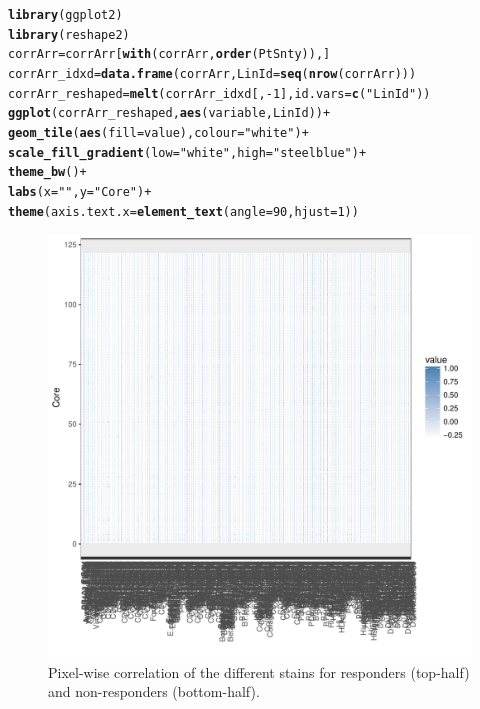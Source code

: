 \documentclass[a4paper]{article}\usepackage[]{graphicx}\usepackage[]{color}
\makeatletter
\def\maxwidth{ %
  \ifdim\Gin@nat@width>\linewidth
    \linewidth
  \else
    \Gin@nat@width
  \fi
}
\newcommand{\hlnum}[1]{\textcolor[rgb]{0.686,0.059,0.569}{#1}}%
\newcommand{\hlstr}[1]{\textcolor[rgb]{0.192,0.494,0.8}{#1}}%
\newcommand{\hlopt}[1]{\textcolor[rgb]{0,0,0}{#1}}%
\newcommand{\hlstd}[1]{\textcolor[rgb]{0.345,0.345,0.345}{#1}}%
\newcommand{\hlkwb}[1]{\textcolor[rgb]{0.69,0.353,0.396}{#1}}%
\newcommand{\hlkwc}[1]{\textcolor[rgb]{0.333,0.667,0.333}{#1}}%
\newcommand{\hlkwd}[1]{\textcolor[rgb]{0.737,0.353,0.396}{\textbf{#1}}}%
\newenvironment{kframe}{%
 \def\at@end@of@kframe{}%
 \ifinner\ifhmode%
  \def\at@end@of@kframe{\end{minipage}}%
  \begin{minipage}{\columnwidth}%
 \fi\fi%
 \def\FrameCommand##1{\hskip\@totalleftmargin \hskip-\fboxsep
 \colorbox{shadecolor}{##1}\hskip-\fboxsep
     \hskip-\linewidth \hskip-\@totalleftmargin \hskip\columnwidth}%
 \MakeFramed {\advance\hsize-\width
   \@totalleftmargin\z@ \linewidth\hsize
   \@setminipage}}%
 {\par\unskip\endMakeFramed%
 \at@end@of@kframe}
\newenvironment{knitrout}{}{} %
\makeatother
\begin{document}
\begin{knitrout}
\color{fgcolor}\begin{kframe}
\begin{alltt}
\hlkwd{library}\hlstd{(ggplot2)}
\hlkwd{library}\hlstd{(reshape2)}
\hlstd{corrArr} \hlkwb{=} \hlstd{corrArr[}\hlkwd{with}\hlstd{(corrArr,} \hlkwd{order}\hlstd{(PtSnty)), ]}
\hlstd{corrArr_idxd} \hlkwb{=} \hlkwd{data.frame}\hlstd{(corrArr,}\hlkwc{LinId}\hlstd{=}\hlkwd{seq}\hlstd{(}\hlkwd{nrow}\hlstd{(corrArr)))}
\hlstd{corrArr_reshaped} \hlkwb{=} \hlkwd{melt}\hlstd{(corrArr_idxd[,}\hlopt{-}\hlnum{1}\hlstd{],}\hlkwc{id.vars}\hlstd{=}\hlkwd{c}\hlstd{(}\hlstr{"LinId"}\hlstd{))}
\hlkwd{ggplot}\hlstd{(corrArr_reshaped,} \hlkwd{aes}\hlstd{(variable, LinId))} \hlopt{+}
  \hlkwd{geom_tile}\hlstd{(}\hlkwd{aes}\hlstd{(}\hlkwc{fill} \hlstd{= value),}\hlkwc{colour}\hlstd{=}\hlstr{"white"}\hlstd{)} \hlopt{+}
  \hlkwd{scale_fill_gradient}\hlstd{(}\hlkwc{low}\hlstd{=}\hlstr{"white"}\hlstd{,}\hlkwc{high}\hlstd{=}\hlstr{"steelblue"}\hlstd{)} \hlopt{+}
  \hlkwd{theme_bw}\hlstd{()} \hlopt{+}
  \hlkwd{labs}\hlstd{(}\hlkwc{x}\hlstd{=}\hlstr{""}\hlstd{,}\hlkwc{y}\hlstd{=}\hlstr{"Core"}\hlstd{)} \hlopt{+}
  \hlkwd{theme}\hlstd{(}\hlkwc{axis.text.x} \hlstd{=} \hlkwd{element_text}\hlstd{(}\hlkwc{angle}\hlstd{=}\hlnum{90}\hlstd{,} \hlkwc{hjust}\hlstd{=}\hlnum{1}\hlstd{))}
\end{alltt}
\end{kframe}\begin{figure}[h]
\includegraphics[width=\maxwidth]{figure/Fig_CorrMatrices-1} \caption[Pixel-wise correlation of the different stains for responders (top-half) and non-responders (bottom-half)]{Pixel-wise correlation of the different stains for responders (top-half) and non-responders (bottom-half).}\label{fig:Fig_CorrMatrices}
\end{figure}


\end{knitrout}
\end{document}
